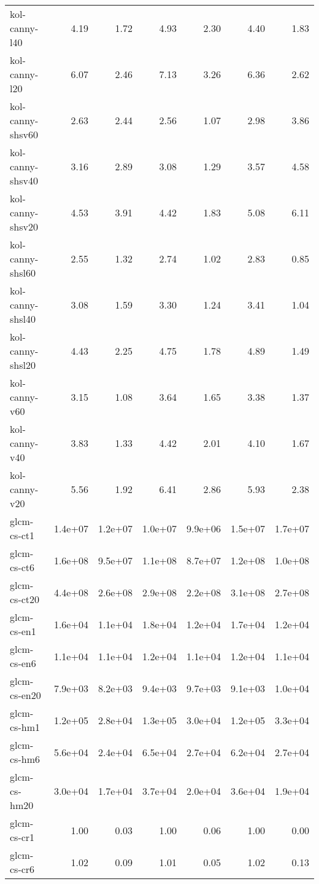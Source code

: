 \begin{tabular}{lrrrrrr}
kol-canny-l40       &    4.19 &    1.72 &    4.93 &    2.30 &    4.40 &    1.83 \\
kol-canny-l20       &    6.07 &    2.46 &    7.13 &    3.26 &    6.36 &    2.62 \\
kol-canny-shsv60    &    2.63 &    2.44 &    2.56 &    1.07 &    2.98 &    3.86 \\
kol-canny-shsv40    &    3.16 &    2.89 &    3.08 &    1.29 &    3.57 &    4.58 \\
kol-canny-shsv20    &    4.53 &    3.91 &    4.42 &    1.83 &    5.08 &    6.11 \\
kol-canny-shsl60    &    2.55 &    1.32 &    2.74 &    1.02 &    2.83 &    0.85 \\
kol-canny-shsl40    &    3.08 &    1.59 &    3.30 &    1.24 &    3.41 &    1.04 \\
kol-canny-shsl20    &    4.43 &    2.25 &    4.75 &    1.78 &    4.89 &    1.49 \\
kol-canny-v60       &    3.15 &    1.08 &    3.64 &    1.65 &    3.38 &    1.37 \\
kol-canny-v40       &    3.83 &    1.33 &    4.42 &    2.01 &    4.10 &    1.67 \\
kol-canny-v20       &    5.56 &    1.92 &    6.41 &    2.86 &    5.93 &    2.38 \\
glcm-cs-ct1         & 1.4e+07 & 1.2e+07 & 1.0e+07 & 9.9e+06 & 1.5e+07 & 1.7e+07 \\
glcm-cs-ct6         & 1.6e+08 & 9.5e+07 & 1.1e+08 & 8.7e+07 & 1.2e+08 & 1.0e+08 \\
glcm-cs-ct20        & 4.4e+08 & 2.6e+08 & 2.9e+08 & 2.2e+08 & 3.1e+08 & 2.7e+08 \\
glcm-cs-en1         & 1.6e+04 & 1.1e+04 & 1.8e+04 & 1.2e+04 & 1.7e+04 & 1.2e+04 \\
glcm-cs-en6         & 1.1e+04 & 1.1e+04 & 1.2e+04 & 1.1e+04 & 1.2e+04 & 1.1e+04 \\
glcm-cs-en20        & 7.9e+03 & 8.2e+03 & 9.4e+03 & 9.7e+03 & 9.1e+03 & 1.0e+04 \\
glcm-cs-hm1         & 1.2e+05 & 2.8e+04 & 1.3e+05 & 3.0e+04 & 1.2e+05 & 3.3e+04 \\
glcm-cs-hm6         & 5.6e+04 & 2.4e+04 & 6.5e+04 & 2.7e+04 & 6.2e+04 & 2.7e+04 \\
glcm-cs-hm20        & 3.0e+04 & 1.7e+04 & 3.7e+04 & 2.0e+04 & 3.6e+04 & 1.9e+04 \\
glcm-cs-cr1         &    1.00 &    0.03 &    1.00 &    0.06 &    1.00 &    0.00 \\
glcm-cs-cr6         &    1.02 &    0.09 &    1.01 &    0.05 &    1.02 &    0.13 \\

\end{tabular}
